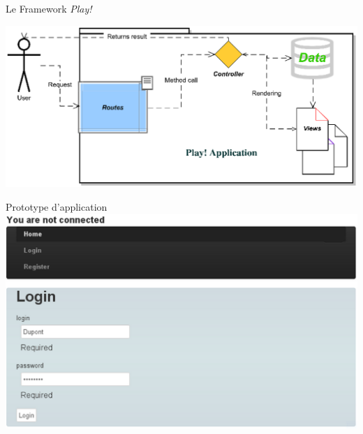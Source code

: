 \documentclass[HeilHazel,pdf,final,colorBG,slideColor]{prosper}
\begin{document}


\begin{slide}[Box]{Le Framework \textit{Play!}}
\bigskip
  \begin{center}
  \centering
    \includegraphics[scale=.6]{img/play_scheme.eps} 
  \end{center}
\end{slide}

\begin{slide}[Box]{Prototype d'application}
  \bc{} 
    \includegraphics[scale=.3]{img/screen_prototype.eps} 
  \ec{}
\end{slide}
\end{document}
